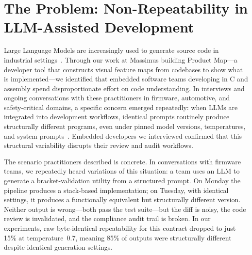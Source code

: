 \documentclass[sigconf]{acmart}
\begin{document}

\frenchspacing
\maketitle

\section{The Problem: Non-Repeatability in LLM-Assisted Development}
\label{sec:problem}

Large Language Models are increasingly used to generate source code in industrial settings~\cite{fan2023large}. Through our work at Massimus building Product Map---a developer tool that constructs visual feature maps from codebases to show what is implemented---we identified that embedded software teams developing in C and assembly spend disproportionate effort on code understanding.  In interviews and ongoing conversations with these practitioners in firmware, automotive, and safety-critical domains, a specific concern emerged repeatedly: when LLMs are integrated into development workflows, identical prompts routinely produce structurally different programs, even under pinned model versions, temperatures, and system prompts~\cite{ouyang2023llm}. Embedded developers we interviewed confirmed that this structural variability disrupts their review and audit workflows.

The scenario practitioners described is concrete. In conversations with firmware teams, we repeatedly heard variations of this situation: a team uses an LLM to generate a bracket-validation utility from a structured prompt. On Monday the pipeline produces a stack-based implementation; on Tuesday, with identical settings, it produces a functionally equivalent but structurally different version. Neither output is wrong---both pass the test suite---but the diff is noisy, the code review is invalidated, and the compliance audit trail is broken. In our experiments, raw byte-identical repeatability for this contract dropped to just 15\% at temperature~0.7, meaning 85\% of outputs were structurally different despite identical generation settings.
\end{document}
